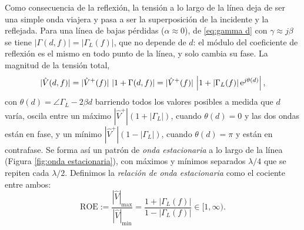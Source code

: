 Como consecuencia de la reflexión, la tensión a lo largo de la línea deja de ser una simple onda viajera y pasa a ser la superposición de la incidente y la reflejada. Para una línea de bajas pérdidas ($\alpha\approx 0$), de \eqref{eq:gamma d} con $\gamma\approx j\beta$ se tiene $|\Gamma(d,f)|=|\Gamma_L(f)|$, que no depende de $d$: el módulo del coeficiente de reflexión es el mismo en todo punto de la línea, y solo cambia su fase. La magnitud de la tensión total,
\begin{equation*}
    |\hat V(d,f)| = |\hat V^+(f)|\, \left|1+\Gamma(d,f)\right| = |\hat V^+(f)|\, \left|1+|\Gamma_L(f)|\,\mathrm{e}^{j\theta(d)}\right|,
\end{equation*}
con $\theta(d)=\angle\Gamma_L - 2\beta d$ barriendo todos los valores posibles a medida que $d$ varía, oscila entre un máximo $|\hat V^+|(1+|\Gamma_L|)$, cuando $\theta(d)=0$ y las dos ondas están en fase, y un mínimo $|\hat V^+|(1-|\Gamma_L|)$, cuando $\theta(d)=\pi$ y están en contrafase. Se forma así un patrón de \emph{onda estacionaria} a lo largo de la línea (Figura \ref{fig:onda estacionaria}), con máximos y mínimos separados $\lambda/4$ que se repiten cada $\lambda/2$. Definimos la \emph{relación de onda estacionaria} como el cociente entre ambos:
\begin{equation}\label{eq:roe}
    \mathrm{ROE} := \frac{|\hat V|_{\max}}{|\hat V|_{\min}} = \frac{1+|\Gamma_L(f)|}{1-|\Gamma_L(f)|} \in [1,\infty).
\end{equation}

